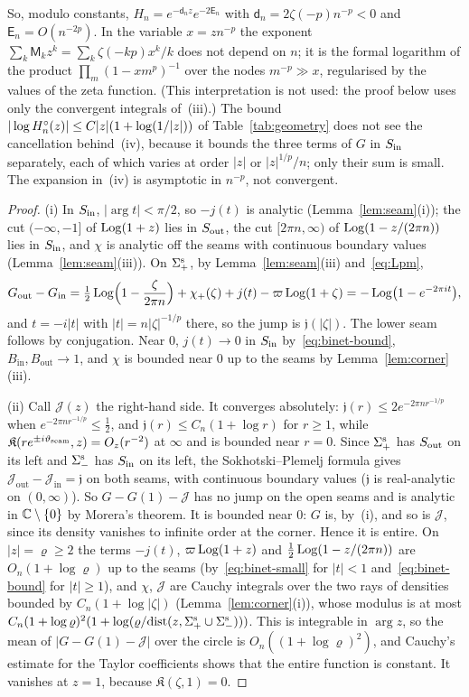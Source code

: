 So, modulo constants, $H_n=e^{-\mathsf d_nz}e^{-2\mathsf E_n}$ with $\mathsf d_n=2\zeta(-p)n^{-p}<0$ and
$\mathsf E_n=O(n^{-2p})$. In the variable $x=zn^{-p}$ the exponent $\sum_k\mathsf M_kz^k=\sum_k\zeta(-kp)x^k/k$ does not depend on $n$; it
is the formal logarithm of the product $\prod_m(1-xm^p)^{-1}$ over the nodes $m^{-p}\gg x$, regularised by the values
of the zeta function. (This interpretation is not used: the proof below uses only the convergent integrals of~(iii).)
The bound $|\log H^{\circ}_n(z)|\le C|z|(1+\log(1/|z|))$ of Table~\ref{tab:geometry} does not see the cancellation behind~(iv),
because it bounds the three terms of $G$ in $S_{\mathrm{in}}$ separately, each of which varies at order $|z|$ or $|z|^{1/p}/n$; only
their sum is small. The expansion in~(iv) is asymptotic in $n^{-p}$, not convergent.

\begin{proof}
(i) In $S_{\mathrm{in}}$, $|\arg t|<\pi/2$, so $-j(t)$ is analytic (Lemma~\ref{lem:seam}(i)); the cut $(-\infty,-1]$ of $\operatorname{Log}(1+z)$
lies in $S_{\mathrm{out}}$, the cut $[2\pi n,\infty)$ of $\operatorname{Log}(1-z/(2\pi n))$ lies in $S_{\mathrm{in}}$, and $\chi$ is analytic off the seams
with continuous boundary values (Lemma~\ref{lem:seam}(iii)). On $\Sigma^{\mathrm{s}}_+$, by Lemma~\ref{lem:seam}(iii) and~\eqref{eq:Lpm},
\[
  G_{\mathrm{out}}-G_{\mathrm{in}}=\tfrac12\operatorname{Log}\Bigl(1-\frac\zeta{2\pi n}\Bigr)+\chi_+(\zeta)+j(t)-\varpi\operatorname{Log}(1+\zeta)
  =-\operatorname{Log}\bigl(1-e^{-2\pi it}\bigr),
\]
and $t=-i|t|$ with $|t|=n|\zeta|^{-1/p}$ there, so the jump is $\mathfrak j(|\zeta|)$. The lower seam follows by
conjugation. Near $0$, $j(t)\to0$ in $S_{\mathrm{in}}$ by~\eqref{eq:binet-bound}, $B_{\mathrm{in}},B_{\mathrm{out}}\to1$, and $\chi$ is
bounded near $0$ up to the seams by Lemma~\ref{lem:corner}(iii).

(ii) Call $\mathcal J(z)$ the right-hand side. It converges absolutely: $\mathfrak j(r)\le2e^{-2\pi nr^{-1/p}}$ when
$e^{-2\pi nr^{-1/p}}\le\frac12$, and $\mathfrak j(r)\le C_n(1+\log r)$ for $r\ge1$, while $\mathfrak K(re^{\pm i\vartheta_{\mathrm{seam}}},z)=O_z(r^{-2})$
at $\infty$ and is bounded near $r=0$. Since $\Sigma^{\mathrm{s}}_+$ has $S_{\mathrm{out}}$ on its left and $\Sigma^{\mathrm{s}}_-$ has $S_{\mathrm{in}}$ on its left,
the Sokhotski--Plemelj formula gives $\mathcal J_{\mathrm{out}}-\mathcal J_{\mathrm{in}}=\mathfrak j$ on both seams, with continuous
boundary values ($\mathfrak j$ is real-analytic on $(0,\infty)$). So $G-G(1)-\mathcal J$ has no jump on the open seams and
is analytic in $\mathbb{C}\setminus\{0\}$ by Morera's theorem. It is bounded near $0$: $G$ is, by~(i), and so is $\mathcal J$,
since its density vanishes to infinite order at the corner. Hence it is entire. On $|z|=\varrho\ge2$ the terms $-j(t)$,
$\varpi\operatorname{Log}(1+z)$ and $\frac12\operatorname{Log}(1-z/(2\pi n))$ are $O_n(1+\log\varrho)$ up to the seams (by~\eqref{eq:binet-small}
for $|t|<1$ and~\eqref{eq:binet-bound} for $|t|\ge1$), and $\chi$, $\mathcal J$ are Cauchy integrals over the two rays of
densities bounded by $C_n(1+\log|\zeta|)$ (Lemma~\ref{lem:corner}(i)), whose modulus is at most
$C_n(1+\log\varrho)^2(1+\log(\varrho/\mathrm{dist}(z,\Sigma^{\mathrm{s}}_+\cup\Sigma^{\mathrm{s}}_-)))$. This is integrable in $\arg z$, so the
mean of $|G-G(1)-\mathcal J|$ over the circle is $O_n((1+\log\varrho)^2)$, and Cauchy's estimate for the Taylor
coefficients shows that the entire function is constant. It vanishes at $z=1$, because $\mathfrak K(\zeta,1)=0$.


\end{proof}
